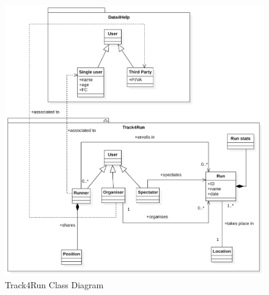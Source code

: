 \documentclass[titlepage]{article}
\begin{document}
		\begin{figure}[H]
			\center
  			\includegraphics[width=\textwidth]{Diagrammi/T4RClass.png}
  			\caption{Track4Run Class Diagram}
 			\label{fig:T4RClass}
		\end{figure}
		
\end{document}
